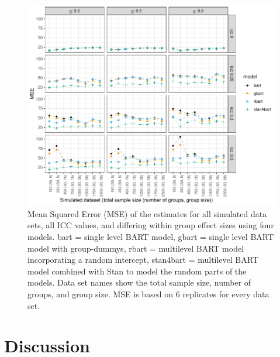 \documentclass[10pt, a4paper, titlepage]{article}
\begin{document}
\begin{figure}[H]
\caption{Mean Squared Error (MSE) of the estimates for all simulated data sets, all ICC values, and differing within group effect sizes using four models. bart = single level BART model, gbart = single level BART model with group-dummys, rbart = multilevel BART model incorporating a random intercept, stan4bart = multilevel BART model combined with Stan to model the random parts of the models. Data set names show the total sample size, number of groups, and group size. MSE is based on 6 replicates for every data set.}
\centering
\label{fig:mseplots}
\includegraphics[width=\textwidth]{mseplots4.pdf}
\end{figure}

\newpage
\section{Discussion}

\newpage


\end{document}
